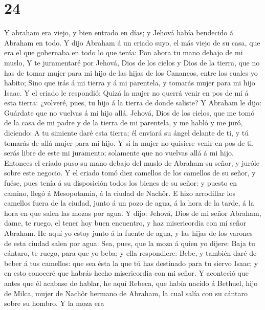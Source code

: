 \hypertarget{section-23}{%
\section{24}\label{section-23}}

 Y abraham era viejo, y bien entrado en días; y Jehová había
bendecido á Abraham en todo.  Y dijo Abraham á un criado
suyo, el más viejo de su casa, que era el que gobernaba en todo lo que
tenía: Pon ahora tu mano debajo de mi muslo,  Y te
juramentaré por Jehová, Dios de los cielos y Dios de la tierra, que no
has de tomar mujer para mi hijo de las hijas de los Cananeos, entre los
cuales yo habito;  Sino que irás á mi tierra y á mi
parentela, y tomarás mujer para mi hijo Isaac.  Y el criado
le respondió: Quizá la mujer no querrá venir en pos de mí á esta tierra:
¿volveré, pues, tu hijo á la tierra de donde saliste?  Y
Abraham le dijo: Guárdate que no vuelvas á mi hijo allá. 
Jehová, Dios de los cielos, que me tomó de la casa de mi padre y de la
tierra de mi parentela, y me habló y me juró, diciendo: A tu simiente
daré esta tierra; él enviará su ángel delante de ti, y tú tomarás de
allá mujer para mi hijo.  Y si la mujer no quisiere venir en
pos de ti, serás libre de este mi juramento; solamente que no vuelvas
allá á mi hijo.  Entonces el criado puso su mano debajo del
muslo de Abraham su señor, y juróle sobre este negocio.  Y
el criado tomó diez camellos de los camellos de su señor, y fuése, pues
tenía á su disposición todos los bienes de su señor: y puesto en camino,
llegó á Mesopotamia, á la ciudad de Nachôr.  E hizo
arrodillar los camellos fuera de la ciudad, junto á un pozo de agua, á
la hora de la tarde, á la hora en que salen las mozas por agua.
 Y dijo: Jehová, Dios de mi señor Abraham, dame, te ruego,
el tener hoy buen encuentro, y haz misericordia con mi señor Abraham.
 He aquí yo estoy junto á la fuente de agua, y las hijas de
los varones de esta ciudad salen por agua:  Sea, pues, que
la moza á quien yo dijere: Baja tu cántaro, te ruego, para que yo beba;
y ella respondiere: Bebe, y también daré de beber á tus camellos: que
sea ésta la que tú has destinado para tu siervo Isaac; y en esto
conoceré que habrás hecho misericordia con mi señor.  Y
aconteció que antes que él acabase de hablar, he aquí Rebeca, que había
nacido á Bethuel, hijo de Milca, mujer de Nachôr hermano de Abraham, la
cual salía con su cántaro sobre su hombro.  Y la moza era
